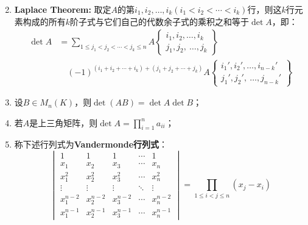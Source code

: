 \begin{property}
\begin{enumerate}
\begin{equation*}
		\end{equation*}
		\item \textbf{Laplace Theorem:} 取定$A$的第$i_1,i_2,\dots,i_k(i_1<i_2<\cdots<i_k)$行，则这$k$行元素构成的所有$k$阶子式与它们自己的代数余子式的乘积之和等于$\det A$，即：
		\begin{align*}
			\det A&=\sum_{1\leqslant j_1<j_2<\cdots<j_k\leqslant n}A\left\{ \begin{array}{l}
				i_1,i_2,\dots,i_k \\
				j_1,j_2,\ \dots,j_k
			\end{array} \right\} \\
			&\quad(-1)^{(i_1+i_2+\cdots+i_k)+(j_1+j_2+\cdots+j_k)}A\left\{ \begin{array}{l}
				i_1',i_2',\dots,i_{n-k}' \\
				j_1',j_2',\ \dots,j_{n-k}'
			\end{array} \right\}
		\end{align*}
		\item 设$B\in M_{n}(K)$，则$\det(AB)=\det A\det B$；
		\item 若$A$是上三角矩阵，则$\det A=\prod\limits_{i=1}^na_{ii}$；
		\item 称下述行列式为\textbf{Vandermonde行列式}：
		\begin{equation*}
			\begin{vmatrix}
				1 & 1 & 1 & \cdots & 1 \\
				x_1 & x_2 & x_3 & \cdots & x_n \\
				x_1^2 & x_2^2 & x_3^2 & \cdots & x_n^2 \\
				\vdots & \vdots & \vdots & \ddots & \vdots \\
				x_1^{n-2} & x_2^{n-2} & x_3^{n-2} & \cdots & x_n^{n-2} \\
				x_1^{n-1} & x_2^{n-1} & x_3^{n-1} & \cdots & x_n^{n-1}
			\end{vmatrix}=\prod_{1\leqslant i<j\leqslant n}(x_j-x_i)
		\end{equation*}
	\end{enumerate}
\end{property}
